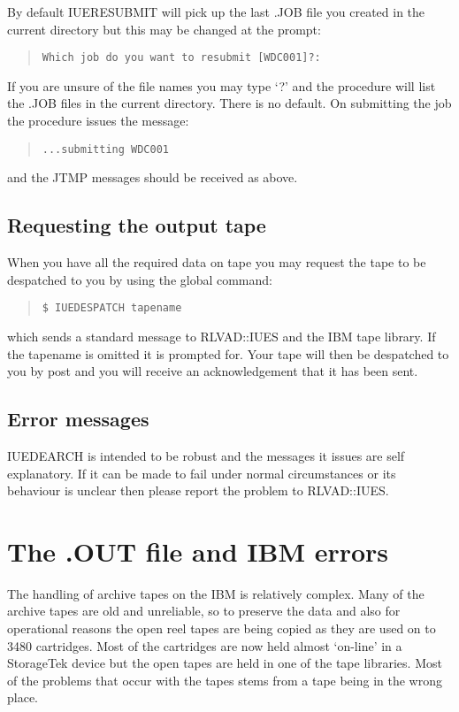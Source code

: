 By default IUERESUBMIT will
pick up the last .JOB file you created in the current directory
but this may be changed at the prompt:

\begin{quote}
{\tt Which job do you want to resubmit [WDC001]?:}
\end{quote}

If you are unsure of the file
names you may type `?' and the procedure will list the .JOB files in the 
current directory. There is no default.
On submitting the job the procedure issues the message:

\begin{quote}
{\tt...submitting WDC001}
\end{quote}

and the JTMP messages should be received as above.

\subsection {Requesting the output tape}
When you have all the required data on tape you may request the tape to be
despatched to you by using the global command:

\begin{quote}
{\tt \$ IUEDESPATCH tapename}
\end{quote}

which sends a standard message to RLVAD::IUES and the IBM tape library.
If the tapename is omitted it is prompted for.
Your tape will then be despatched to you by post and
you will receive an acknowledgement that it has been sent.

\subsection {Error messages}

IUEDEARCH is intended to be robust and the messages it issues are self 
explanatory. If it can be made to fail under normal circumstances or its
behaviour is unclear then
please report the problem to RLVAD::IUES.

\section {The .OUT file and IBM errors}
\label{out}

The handling of archive tapes on the IBM is relatively complex. Many of the 
archive tapes are old and unreliable, so to preserve the data and also for
operational reasons the open reel tapes are being copied as they are
used on to 3480 cartridges. Most of the cartridges are now held almost 
`on-line' in a StorageTek device but the open tapes are held in one of the
tape libraries. Most of the problems that occur with the tapes stems from a
tape being in the wrong place.

